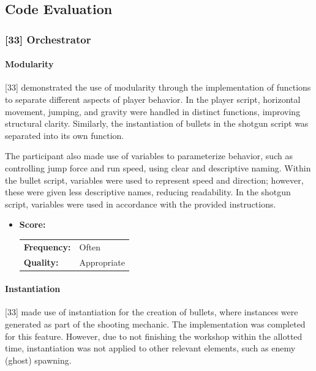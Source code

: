 \subsection{Code Evaluation}
\label{appendix:code-evaluation}

\subsubsection{[33] Orchestrator}

\paragraph{Modularity}

[33] demonstrated the use of modularity through the implementation of functions to separate different aspects of player behavior.
In the player script, horizontal movement, jumping, and gravity were handled in distinct functions, improving structural clarity.
Similarly, the instantiation of bullets in the shotgun script was separated into its own function.

The participant also made use of variables to parameterize behavior, such as controlling jump force and run speed, using clear and descriptive naming.
Within the bullet script, variables were used to represent speed and direction; however, these were given less descriptive names, reducing readability.
In the shotgun script, variables were used in accordance with the provided instructions.




\begin{itemize}
	\item \textbf{Score:}
	      \begin{tabular}{ll}
		      \textbf{Frequency:} & Often       \\
		      \textbf{Quality:}   & Appropriate \\
	      \end{tabular}
\end{itemize}

\paragraph{Instantiation}

[33] made use of instantiation for the creation of bullets, where instances were generated as part of the shooting mechanic.
The implementation was completed for this feature.
However, due to not finishing the workshop within the allotted time, instantiation was not applied to other relevant elements, such as enemy (ghost) spawning.


